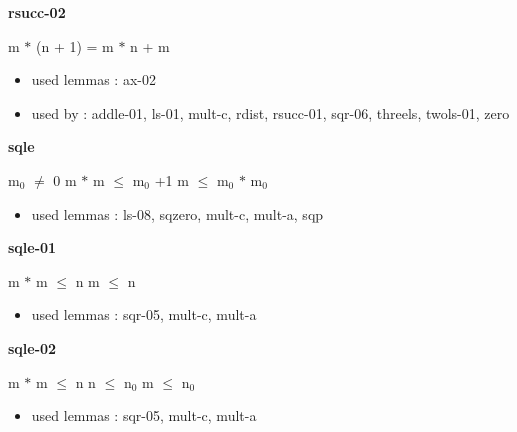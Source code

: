 \documentclass[a4paper]{article}
\begin{document}
\medskip

\bigskip

{\large\bf rsucc-02}

\medskip

 \Fol m $*$ (n + 1) = m $*$ n + m

\begin{itemize}


\item       used lemmas  : ax-02
\item       used by      : addle-01, ls-01, mult-c, rdist, rsucc-01, sqr-06, threels, twols-01, zero

\end{itemize}

\medskip

\bigskip

{\large\bf sqle}

\medskip

 \Fol $\mbox{m}_{0}$ $\neq$ 0 \And m $*$ m $\le$ $\mbox{m}_{0}$ +1 \Imp m $\le$ $\mbox{m}_{0}$ $*$ $\mbox{m}_{0}$

\begin{itemize}


\item       used lemmas  : ls-08, sqzero, mult-c, mult-a, sqp

\end{itemize}

\medskip

\bigskip

{\large\bf sqle-01}

\medskip

 \Fol m $*$ m $\le$ n \Imp m $\le$ n

\begin{itemize}


\item       used lemmas  : sqr-05, mult-c, mult-a

\end{itemize}

\medskip

\bigskip

{\large\bf sqle-02}

\medskip

 \Fol m $*$ m $\le$ n \And n $\le$ $\mbox{n}_{0}$ \Imp m $\le$ $\mbox{n}_{0}$

\begin{itemize}


\item       used lemmas  : sqr-05, mult-c, mult-a

\end{itemize}
\end{document}

